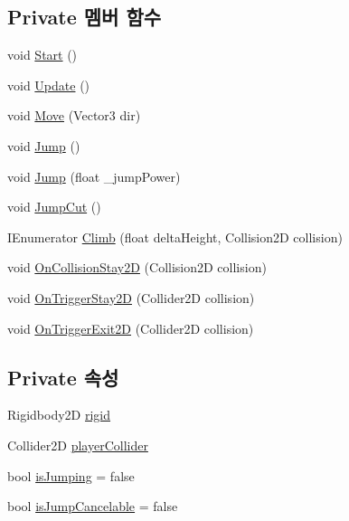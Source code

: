 \subsection*{Private 멤버 함수}
\begin{DoxyCompactItemize}
\item 
void \mbox{\hyperlink{class_player_movement_abf3660ca2b1a352b4a9da98437c61aa3}{Start}} ()
\item 
void \mbox{\hyperlink{class_player_movement_aaf9b77d7177d538be9c1447d08191322}{Update}} ()
\item 
void \mbox{\hyperlink{class_player_movement_a8dc9af4cb0a951c96b3faa37bab75ccd}{Move}} (Vector3 dir)
\item 
void \mbox{\hyperlink{class_player_movement_addc5f78eff185c73ab0a77cc04f13bd9}{Jump}} ()
\item 
void \mbox{\hyperlink{class_player_movement_a8f312c0c10e3e9c978a6e1cd1bada492}{Jump}} (float \+\_\+jump\+Power)
\item 
void \mbox{\hyperlink{class_player_movement_ada23e8d376cdcca2ac7d87f3d05b52cf}{Jump\+Cut}} ()
\item 
I\+Enumerator \mbox{\hyperlink{class_player_movement_a6ff1fb59f41c43876325fe8eee66a2cc}{Climb}} (float delta\+Height, Collision2D collision)
\item 
void \mbox{\hyperlink{class_player_movement_a66307ea038b50ef0f1ea1276507cc66c}{On\+Collision\+Stay2D}} (Collision2D collision)
\item 
void \mbox{\hyperlink{class_player_movement_a5406d2bb56031c42b5d47431d6b47915}{On\+Trigger\+Stay2D}} (Collider2D collision)
\item 
void \mbox{\hyperlink{class_player_movement_acc95a5dd6a7b911666ed146fefb8d5b2}{On\+Trigger\+Exit2D}} (Collider2D collision)
\end{DoxyCompactItemize}
\subsection*{Private 속성}
\begin{DoxyCompactItemize}
\item 
Rigidbody2D \mbox{\hyperlink{class_player_movement_a722cf27204e5c715e715d0bbe019f2d4}{rigid}}
\item 
Collider2D \mbox{\hyperlink{class_player_movement_ab59d00c7bd03ee76c94ece406698cdcb}{player\+Collider}}
\item 
bool \mbox{\hyperlink{class_player_movement_a1a59782fc52356398194e29255f1a0ae}{is\+Jumping}} = false
\item 
bool \mbox{\hyperlink{class_player_movement_aff9c832db827f7af7d03c7c49842179f}{is\+Jump\+Cancelable}} = false
\end{DoxyCompactItemize}


